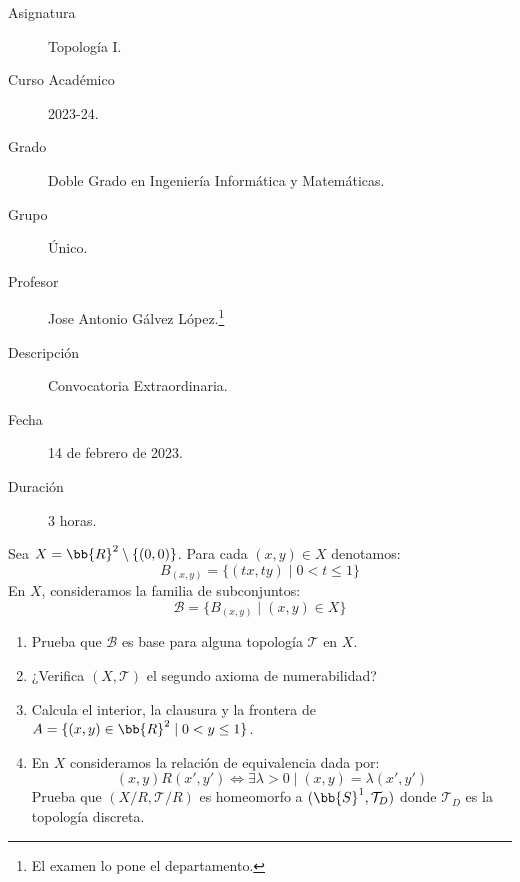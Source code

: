 \documentclass[12pt]{article}
\newcounter{ejercicio}[section] %
\newcounter{ejercicio}
\begin{document}

    
    

    \begin{description}
        \item[Asignatura] Topología I.
        \item[Curso Académico] 2023-24.
        \item[Grado] Doble Grado en Ingeniería Informática y Matemáticas.
        \item[Grupo] Único.
        \item[Profesor] Jose Antonio Gálvez López.\footnote{El examen lo pone el departamento.}
        \item[Descripción] Convocatoria Extraordinaria.
        \item[Fecha] 14 de febrero de 2023.
        \item[Duración] 3 horas.
    
    \end{description}
    \newpage

    \begin{ejercicio}[4.5 puntos]
        Sea $X = \bb{R}^2 \setminus \{(0,0)\}$. Para cada $(x,y) \in X$ denotamos:
        $$B_{(x,y)} = \{(tx, ty) \mid 0 < t \leq 1 \}$$
        En $X$, consideramos la familia de subconjuntos:
        $$\mathcal{B} = \{B_{(x,y)} \mid (x,y) \in X\}$$
        \begin{enumerate}[label=(\alph*)]
            \item Prueba que $\mathcal{B}$ es base para alguna topología $\mathcal{T}$ en $X$.
            \item ¿Verifica $(X, \mathcal{T})$ el segundo axioma de numerabilidad?
            \item Calcula el interior, la clausura y la frontera de $A = \{ (x,y) \in \bb{R}^2 \mid 0 < y \leq 1\}$.
            \item En $X$ consideramos la relación de equivalencia dada por:
                $$(x,y)R(x',y') \Leftrightarrow \exists \lambda > 0 \mid (x,y) = \lambda(x',y')$$
                Prueba que $(X/R, \mathcal{T}/R)$ es homeomorfo a $(\bb{S}^1, \mathcal{T}_D)$ donde $\mathcal{T}_D$ es la topología discreta.
        \end{enumerate}
    \end{ejercicio}
        
\end{document}
